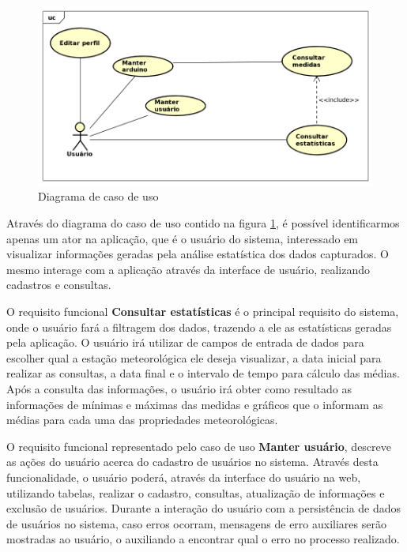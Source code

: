 \begin{figure}[H]
    \centering
    \caption{Diagrama de caso de uso} \label{fig:figure_diagrama_caso_uso}
    \includegraphics[scale=0.6]{diagrams/caso_de_uso.png}
    \hfill
\end{figure}

Através do diagrama do caso de uso contido na figura \ref{fig:figure_diagrama_caso_uso}, é possível identificarmos apenas um ator na aplicação, que é o usuário do sistema, interessado em visualizar informações geradas pela análise estatística dos dados capturados. O mesmo interage com a aplicação através da interface de usuário, realizando cadastros e consultas.

O requisito funcional \textbf{Consultar estatísticas} é o principal requisito do sistema, onde o usuário fará a filtragem dos dados, trazendo a ele as estatísticas geradas pela aplicação.
O usuário irá utilizar de campos de entrada de dados para escolher qual a estação meteorológica ele deseja visualizar, a data inicial para realizar as consultas, a data final e o intervalo de tempo para cálculo das médias.
Após a consulta das informações, o usuário irá obter como resultado as informações de mínimas e máximas das medidas e gráficos que o informam as médias para cada uma das propriedades meteorológicas.

O requisito funcional representado pelo caso de uso \textbf{Manter usuário}, descreve as ações do usuário acerca do cadastro de usuários no sistema.
Através desta funcionalidade, o usuário poderá, através da interface do usuário na web, utilizando tabelas, realizar o cadastro, consultas, atualização de informações e exclusão de usuários.
Durante a interação do usuário com a persistência de dados de usuários no sistema, caso erros ocorram, mensagens de erro auxiliares serão mostradas ao usuário, o auxiliando a encontrar qual o erro no processo realizado.

